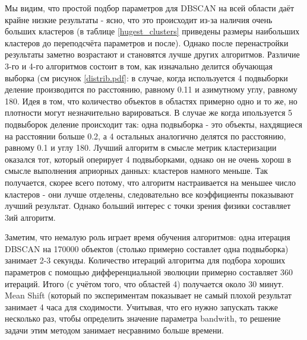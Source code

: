 \documentclass[12pt,fleqn]{article}
\begin{document}
Мы видим, что простой подбор параметров для DBSCAN на всей области даёт крайне низкие результаты - ясно, что это происходит из-за наличия очень больших кластеров (в таблице \ref{hugest_clusters} приведены размеры наибольших кластеров до переподсчёта параметров и после). Однако после перенастройки результаты заметно возрастают и становятся лучше других алгоритмов. Различие 3-го и 4-го алгоритмов состоит в том, как изначально делится обучающая выборка (см рисунок \ref{distrib.pdf}: в случае, когда используется 4 подвыборки деление производится по расстоянию, равному 0.11 и азимутному углу, равному 180. Идея в том, что количество объектов в областях примерно одно и то же, но плотности могут незначительно варироваться. В случае же когда ипользуется 5 подвыборок деление происходит так: одна подвыборка - это объекты, нахдящиеся на расстоянии больше 0.2, а 4 остальных аналогично делятся по расстоянию, равному 0.1 и углу 180. Лучший алгоритм в смысле метрик кластеризации оказался тот, который оперирует 4 подвыборками, однако он не очень хорош в смысле выполнения априорных данных: кластеров намного меньше. Так получается, скорее всего потому, что алгоритм настраивается на меньшее число кластеров - они лучше отделены, следовательно все коэффициенты показывают лучший результат. Однако больший интерес с точки зрения физики составляет 3ий алгоритм. 

Заметим, что немалую роль играет время обучения алгоритмов: одна итерация DBSCAN на 170000 объектов (столько примерно составлет одна подвыборка) занимает 2-3 секунды. Количество итераций алгоритма для подбора хороших параметров с помощью дифференциальной эволюции примерно составляет 360 итераций. Итого (с учётом того, что областей 4) получается около 30 минут.
Mean Shift (который по экспериментам показывает не самый плохой результат занимает 4 часа для сходимости. Учитывая, что его нужно запускать также несколько раз, чтобы определить значение параметра bandwith, то решение задачи этим методом занимает несравнимо больше времени. 
\end{document}
